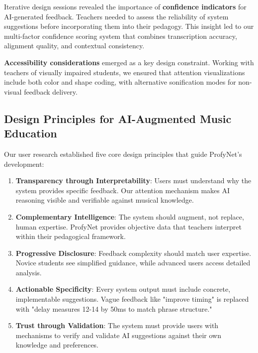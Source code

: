 \documentclass[sigconf,review,anonymous]{acmart}
\begin{document}
Iterative design sessions revealed the importance of \textbf{confidence indicators} for AI-generated feedback. Teachers needed to assess the reliability of system suggestions before incorporating them into their pedagogy. This insight led to our multi-factor confidence scoring system that combines transcription accuracy, alignment quality, and contextual consistency.

\textbf{Accessibility considerations} emerged as a key design constraint. Working with teachers of visually impaired students, we ensured that attention visualizations include both color and shape coding, with alternative sonification modes for non-visual feedback delivery.

\subsection{Design Principles for AI-Augmented Music Education}

Our user research established five core design principles that guide ProfyNet's development:

\begin{enumerate}
\item \textbf{Transparency through Interpretability}: Users must understand why the system provides specific feedback. Our attention mechanism makes AI reasoning visible and verifiable against musical knowledge.

\item \textbf{Complementary Intelligence}: The system should augment, not replace, human expertise. ProfyNet provides objective data that teachers interpret within their pedagogical framework.

\item \textbf{Progressive Disclosure}: Feedback complexity should match user expertise. Novice students see simplified guidance, while advanced users access detailed analysis.

\item \textbf{Actionable Specificity}: Every system output must include concrete, implementable suggestions. Vague feedback like "improve timing" is replaced with "delay measures 12-14 by 50ms to match phrase structure."

\item \textbf{Trust through Validation}: The system must provide users with mechanisms to verify and validate AI suggestions against their own knowledge and preferences.
\end{enumerate}
\end{document}
